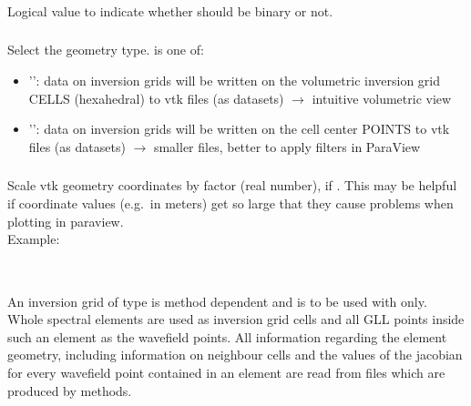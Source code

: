 \subsubsection{}
Logical value to indicate whether  should be binary or not.
\subsubsection{}
Select the geometry type.  is one of:
\begin{itemize}
\item[]'': data on inversion grids will be written on the volumetric inversion grid CELLS (hexahedral) to vtk files (as  datasets) $\rightarrow$ intuitive volumetric view
\item[]'': data on inversion grids will be written on the cell center POINTS to vtk files (as  datasets) $\rightarrow$ smaller files, better to apply filters in ParaView
\end{itemize}
\subsubsection{}
Scale vtk geometry coordinates by factor  (real number), if 
. This may be helpful if coordinate values (e.g.\ in meters) 
get so large that they cause problems when plotting in paraview.\\
Example:\\
\\
%
\subsection{} \label{basic_steps,sec:invgrid,sub:specfem3d}
%
An inversion grid of type  is method dependent and is to be used with 
 only. Whole spectral elements are used as inversion grid cells and all 
GLL points inside such an element as the wavefield points. All information regarding the element 
geometry, including information on neighbour cells and the values of the jacobian for every wavefield 
point contained in an element are read from files which are produced by  methods.

